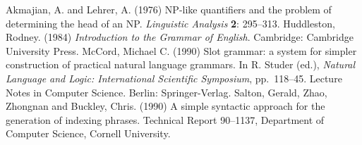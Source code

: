 \documentclass{cnle}
\begin{document}
\begin{thebibliography}{}
   Akmajian, A. and Lehrer, A. (1976) NP-like quantifiers and the
   problem of determining the head of an NP. {\it Linguistic
   Analysis\/} {\bf 2}: 295--313.
   Huddleston, Rodney. (1984) {\it Introduction to the Grammar of
   English}. Cambridge: Cambridge University Press.
   McCord, Michael C. (1990) Slot grammar: a system for simpler
   construction of practical natural language grammars. In R.
   Studer (ed.), {\it Natural Language and Logic: International
   Scientific Symposium}, pp.~118--45. Lecture Notes in Computer
   Science. Berlin: Springer-Verlag.
   Salton, Gerald, Zhao, Zhongnan and Buckley, Chris. (1990)
   A simple syntactic approach for the generation of indexing
   phrases. Technical Report 90--1137, Department of Computer
   Science, Cornell University.
\end{thebibliography}

\label{lastpage}
\end{document}
